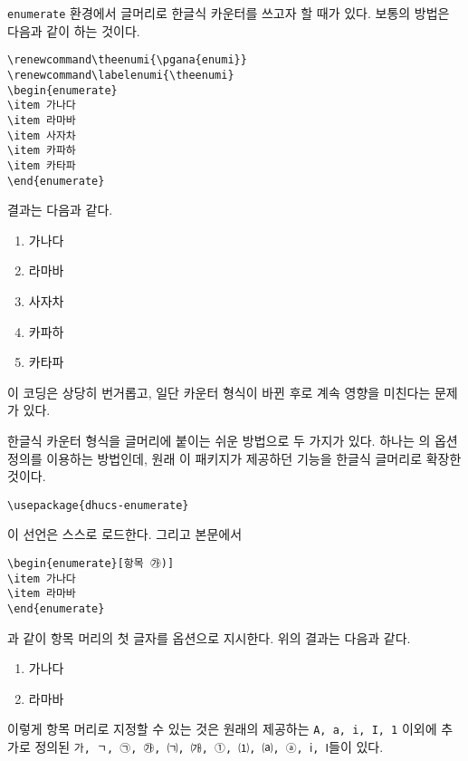 \texttt{enumerate} 환경에서 글머리로 한글식 카운터를 쓰고자 할 때가
있다. 보통의 방법은 다음과 같이 하는 것이다.
\begin{Verbatim}[fontsize=\small]
\renewcommand\theenumi{\pgana{enumi}}
\renewcommand\labelenumi{\theenumi}
\begin{enumerate}
\item 가나다
\item 라마바
\item 사자차
\item 카파하
\item 카타파
\end{enumerate}
\end{Verbatim}
결과는 다음과 같다.
\let\ORIGtheenumi\theenumi
\let\ORIGlabelenumi\labelenumi
\renewcommand\theenumi{\pgana{enumi}}
\renewcommand\labelenumi{\theenumi}
\begin{enumerate}
\item 가나다
\item 라마바
\item 사자차
\item 카파하
\item 카타파
\end{enumerate}
\let\theenumi\ORIGtheenumi
\let\labelenumi\ORIGlabelenumi

이 코딩은 상당히 번거롭고, 일단 카운터 형식이 바뀐 후로
계속 영향을 미친다는 문제가 있다.

한글식 카운터 형식을 글머리에 붙이는 쉬운 방법으로 두 가지가 있다.
하나는 의 옵션 정의를 이용하는 방법인데, 원래 
이 패키지가 제공하던 기능을 한글식 글머리로 확장한 것이다.
\begin{verbatim}
\usepackage{dhucs-enumerate}
\end{verbatim}
이 선언은 \를 스스로 로드한다. 그리고 본문에서
\begin{verbatim}
\begin{enumerate}[항목 ㉮)]
\item 가나다
\item 라마바
\end{enumerate}
\end{verbatim}
과 같이 항목 머리의 첫 글자를 옵션으로 지시한다. 위의 결과는
다음과 같다.
\begin{enumerate}[항목 ㉮)]
\item 가나다
\item 라마바
\end{enumerate}
이렇게 항목 머리로 지정할 수 있는 것은 원래의 \이
제공하는 \texttt{A, a, i, I, 1} 이외에 추가로 정의된
\texttt{가, ㄱ, ㉠, ㉮, ㈀, ㈎, ①, ⑴, ⒜, ⓐ, ⅰ, Ⅰ}들이
있다.

